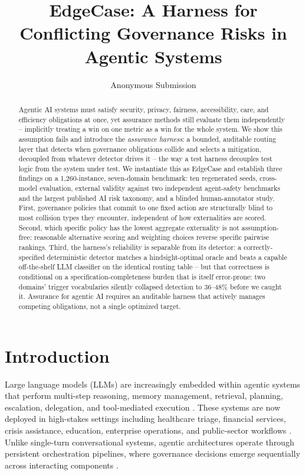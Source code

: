 \documentclass[letterpaper]{article} %
\title{EdgeCase: A Harness for Conflicting Governance Risks in Agentic Systems}
\author{
    Anonymous Submission
}
\begin{document}
\maketitle

\begin{abstract}
Agentic AI systems must satisfy security, privacy, fairness, accessibility, care, and efficiency obligations at once, yet assurance methods still evaluate them independently -- implicitly treating a win on one metric as a win for the whole system. We show this assumption fails and introduce the \emph{assurance harness}: a bounded, auditable routing layer that detects when governance obligations collide and selects a mitigation, decoupled from whatever detector drives it -- the way a test harness decouples test logic from the system under test. We instantiate this as EdgeCase and establish three findings on a 1,260-instance, seven-domain benchmark: ten regenerated seeds, cross-model evaluation, external validity against two independent agent-safety benchmarks and the largest published AI risk taxonomy, and a blinded human-annotator study. First, governance policies that commit to one fixed action are structurally blind to most collision types they encounter, independent of how externalities are scored. Second, which specific policy has the lowest aggregate externality is not assumption-free: reasonable alternative scoring and weighting choices reverse specific pairwise rankings. Third, the harness's reliability is separable from its detector: a correctly-specified deterministic detector matches a hindsight-optimal oracle and beats a capable off-the-shelf LLM classifier on the identical routing table -- but that correctness is conditional on a specification-completeness burden that is itself error-prone: two domains' trigger vocabularies silently collapsed detection to 36--48\% before we caught it. Assurance for agentic AI requires an auditable harness that actively manages competing obligations, not a single optimized target.
\end{abstract}

\begin{links}
\end{links}

\section{Introduction}
Large language models (LLMs) are increasingly embedded within agentic systems that perform multi-step reasoning, memory management, retrieval, planning, escalation, delegation, and tool-mediated execution \citep{yao2023react,schick2023toolformer,park2023generative,sapkota2025aiagents,oecd2026landscape}. These systems are now deployed in high-stakes settings including healthcare triage, financial services, crisis assistance, education, enterprise operations, and public-sector workflows \citep{hughes2025aiagents,brohi2025landscape}. Unlike single-turn conversational systems, agentic architectures operate through persistent orchestration pipelines, where governance decisions emerge sequentially across interacting components \citep{yao2023react,wu2024autogen,sapkota2025aiagents}.
\end{document}

